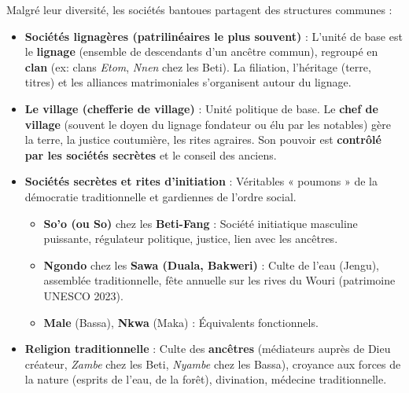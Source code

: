 \documentclass[11pt]{article}
\begin{document}
\begin{propriete}
Malgré leur diversité, les sociétés bantoues partagent des structures communes :
\begin{itemize}
    \item \textbf{Sociétés lignagères (patrilinéaires le plus souvent)} : L'unité de base est le \textbf{lignage} (ensemble de descendants d'un ancêtre commun), regroupé en \textbf{clan} (ex: clans \textit{Etom}, \textit{Nnen} chez les Beti). La filiation, l'héritage (terre, titres) et les alliances matrimoniales s'organisent autour du lignage.
    \item \textbf{Le village (chefferie de village)} : Unité politique de base. Le \textbf{chef de village} (souvent le doyen du lignage fondateur ou élu par les notables) gère la terre, la justice coutumière, les rites agraires. Son pouvoir est \textbf{contrôlé par les sociétés secrètes} et le conseil des anciens.
    \item \textbf{Sociétés secrètes et rites d'initiation} : Véritables « poumons » de la démocratie traditionnelle et gardiennes de l'ordre social.
    \begin{itemize}
        \item \textbf{So'o (ou So)} chez les \textbf{Beti-Fang} : Société initiatique masculine puissante, régulateur politique, justice, lien avec les ancêtres.
        \item \textbf{Ngondo} chez les \textbf{Sawa (Duala, Bakweri)} : Culte de l'eau (Jengu), assemblée traditionnelle, fête annuelle sur les rives du Wouri (patrimoine UNESCO 2023).
        \item \textbf{Male} (Bassa), \textbf{Nkwa} (Maka) : Équivalents fonctionnels.
    \end{itemize}
    \item \textbf{Religion traditionnelle} : Culte des \textbf{ancêtres} (médiateurs auprès de Dieu créateur, \textit{Zambe} chez les Beti, \textit{Nyambe} chez les Bassa), croyance aux forces de la nature (esprits de l'eau, de la forêt), divination, médecine traditionnelle.
\end{itemize}
\end{propriete}
\end{document}
